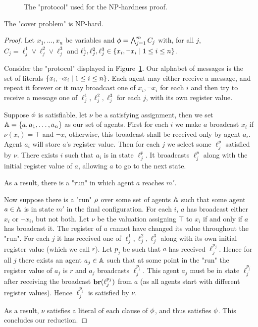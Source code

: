 \begin{figure}[h]
	
	\caption{The "protocol" used for the NP-hardness proof.}
	\label{fig:np-hard}
\end{figure}

\begin{proposition}
	\label{prop:np-hard-query-cover}
	The "cover problem" is NP-hard.
\end{proposition}

\begin{proof}
Let $x_1, \ldots, x_n$ be variables and $\phi = \bigwedge_{j=1}^m C_j$ with, for all $j$, $C_j = \ell_j^1 \lor \ell_j^2 \lor \ell_j^3$ and $\ell_j^1, \ell_j^2, \ell_j^3 \in \{x_i, \neg x_i \mid 1 \leq i \leq n\}$. 

Consider the "protocol" displayed in Figure~\ref{fig:np-hard}.
Our alphabet of messages is the set of literals $\{x_i, \neg x_i \mid 1 \leq i \leq n\}$.
Each agent may either receive a message, and repeat it forever or it may broadcast one of $x_i, \neg x_i$ for each $i$ and then try to receive a message one of $\ell_j^1, \ell_j^2, \ell_j^3$ for each $j$, with its own register value.

Suppose $\phi$ is satisfiable, let $\nu$ be a satisfying assignment, then we set $\mathbb{A} = \{a, a_1, \ldots, a_n\}$ as our set of agents. First for each $i$ we make $a$ broadcast $x_i$ if $\nu(x_i)= \top$ and $\neg x_i$ otherwise, this broadcast shall be received only by agent $a_i$. Agent $a_i$ will store $a$'s register value.
Then for each $j$ we select some $\ell_j^p$ satisfied by $\nu$. There exists $i$ such that $a_i$ is in state $\ell_j^p$. It broadcasts $\ell_j^p$ along with the initial register value of $a$, allowing $a$ to go to the next state.

As a result, there is a "run" in which agent $a$ reaches $m'$.

Now suppose there is a "run" $\rho$ over some set of agents $\mathbb{A}$ such that some agent $a \in \mathbb{A}$ is in state $m'$ in the final configuration.
For each $i$, $a$ has broadcast either $x_i$ or $\neg x_i$, but not both.
Let $\nu$ be the valuation assigning $\top$ to $x_i$ if and only if $a$ has broadcast it.
The register of $a$ cannot have changed its value throughout the "run". 
For each $j$ it has received one of $\ell_j^1, \ell_j^2, \ell_j^3$ along with its own initial register value (which we call $r$). Let $p_j$ be such that $a$ has received $\ell_j^{p_j}$.
Hence for all $j$ there exists an agent $a_j \in \mathbb{A}$ such that at some point in the "run" the register value of $a_j$ is $r$ and $a_j$ broadcasts $\ell_j^{p_j}$.
This agent $a_j$ must be in state $\ell_j^{p_j}$ after receiving the broadcast $\textbf{br}(\ell_j^{p_j})$ from $a$ (as all agents start with different register values).
Hence $\ell_j^{p_j}$ is satisfied by $\nu$. 

As a result, $\nu$ satisfies a literal of each clause of $\phi$, and thus satisfies $\phi$. This concludes our reduction.
\end{proof}

